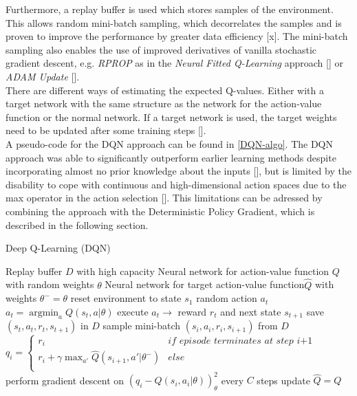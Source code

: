 Furthermore, a replay buffer is used which stores samples of the environment. This allows random mini-batch sampling, which decorrelates the samples and is proven to improve the performance by greater data efficiency [x]. The mini-batch sampling also enables the use of improved derivatives of vanilla stochastic gradient descent, e.g. \textit{RPROP} as in the \textit{Neural Fitted Q-Learning} approach [\cite{riedmiller2005neural}] or \textit{ADAM Update} [\cite{kingma2014adam}].\\
There are different ways of estimating the expected Q-values. Either with a target network with the same structure as the network for the action-value function or the normal network. If a target network is used, the target weights need to be updated after some training steps [\cite{mnih2015human}].\\
A pseudo-code for the DQN approach can be found in \ref{DQN-algo}.
The DQN approach was able to significantly outperform earlier learning methods despite incorporating almost no prior knowledge about the inputs [\cite{mnih2013playing}], but is limited by the disability to cope with continuous and high-dimensional action spaces due to the max operator in the action selection [\cite{lillicrap2015continuous}]. This limitations can be adressed by combining the approach with the Deterministic Policy Gradient, which is described in the following section.

\begin{algorithm}
	\caption{Deep Q-Learning (DQN)}\label{DQN-algo}
	\begin{algorithmic}
		\REQUIRE Replay buffer $\mathit{D}$ with high capacity
		\REQUIRE Neural network for action-value function $\mathit{Q}$
		with random weights $\theta$
		\REQUIRE Neural network for target action-value function$
		\mathit{\hat{Q}}$ with weights $\theta^-=\theta$
		\STATE reset environment to state $s_1$
		\STATE random action $a_t$
		\ELSE
		\STATE $a_t=\operatorname*{argmin}_a Q(s_t,a|\theta)$
		\ENDIF
		\STATE execute $a_t \rightarrow$ reward $r_t$ and next state 
		$s_{t+1}$
		\STATE save $(s_t, a_t, r_t,s_{t+1})$ in $D$
		\STATE sample mini-batch $(s_i, a_i, r_i,s_{i+1})$ from $D$
		\STATE $q_i =
			\begin{cases}
			r_i & \textit{if episode terminates at step i+1}\\
			r_i+\gamma \max_{a'}\hat{Q}(s_{i+1}, a'|\theta^{-})& 
			else\\			
			\end{cases}$
		\STATE perform gradient descent on $\left(q_i-Q\left(s_i, 
		a_i|\theta\right)\right)^2_\theta$
		\STATE every $C$ steps update $\hat{Q}=Q$
		\ENDFOR
		\ENDFOR
	\end{algorithmic}
\end{algorithm}



